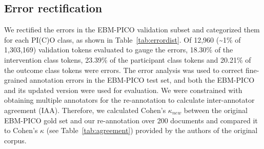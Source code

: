 \documentclass[10.7pt,]{article}
\begin{document}
\subsection{Error rectification}
%
We rectified the errors in the EBM-PICO validation subset and categorized them for each PI(C)O class, as shown in Table~\ref{tab:errordist}.
Of 12,960 (\textasciitilde1\% of 1,303,169) validation tokens evaluated to gauge the errors, 18.30\% of the intervention class tokens, 23.39\% of the participant class tokens and 20.21\% of the outcome class tokens were errors.
The error analysis was used to correct fine-grained annotation errors in the EBM-PICO test set, and both the EBM-PICO and its updated version were used for evaluation.
We were constrained with obtaining multiple annotators for the re-annotation to calculate inter-annotator agreement (IAA).
Therefore, we calculated Cohen's $\kappa_{new}$ between the original EBM-PICO gold set and our re-annotation over 200 documents and compared it to Cohen's $\kappa$ (see Table~\ref{tab:agreement}) provided by the authors of the original corpus.\cite{nye2018corpus}
\end{document}
